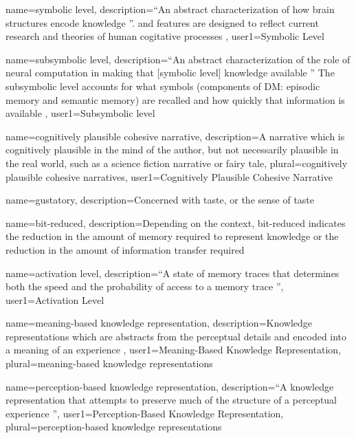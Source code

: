 {
  name=symbolic level,
  description={``An abstract characterization of how brain structures encode knowledge \citep{Anderson2007HowCan}''.  and  features are designed to reflect current research and theories of human cogitative processes \citep{ACTR_6Tutorial2012}},
  user1={Symbolic Level}
}

{
  name=subsymbolic level,
  description={``An abstract characterization of the role of neural computation in making that [symbolic level] knowledge available \citep{Anderson2007HowCan}'' The subsymbolic level accounts for what symbols (components of \gls{DM}: episodic memory and \gls{semantic memory}) are recalled and how quickly that information is available \citep{Anderson2007HowCan}},
  user1={Subsymbolic level}
}

{
  name=cognitively plausible cohesive narrative,
  description={A \gls{narrative} which is \gls{cognitively plausible} in the mind of the author, but not necessarily plausible in the real world, such as a science fiction \gls{narrative} or fairy tale},
  plural=cognitively plausible cohesive narratives,
  user1={Cognitively Plausible Cohesive Narrative}
}

{
  name=gustatory,
  description={Concerned with taste, or the sense of taste \citep{lynott2009embodied}}
}

{
  name=bit-reduced,
  description={Depending on the context, bit-reduced indicates the reduction in the amount of memory required to represent knowledge or the reduction in the amount of information transfer required}
}

{
  name=activation level,
  description={``A state of memory traces that determines both the speed and the probability of access to a memory trace
  \citep[183]{anderson2005cognitive}''},
  user1={Activation Level}
}

{
  name={meaning-based knowledge representation},
  description={Knowledge representations which
  are abstracts from the perceptual details and encoded into a meaning of an experience \citep[106]{anderson2005cognitive}},
  user1={Meaning-Based Knowledge Representation},
  plural=meaning-based knowledge representations
}

{
  name=perception-based knowledge representation,
  description={``A knowledge representation that attempts to preserve much of the structure of a perceptual experience
  \citep[106]{anderson2005cognitive}''},
  user1={Perception-Based Knowledge Representation},
  plural=perception-based knowledge representations
}

